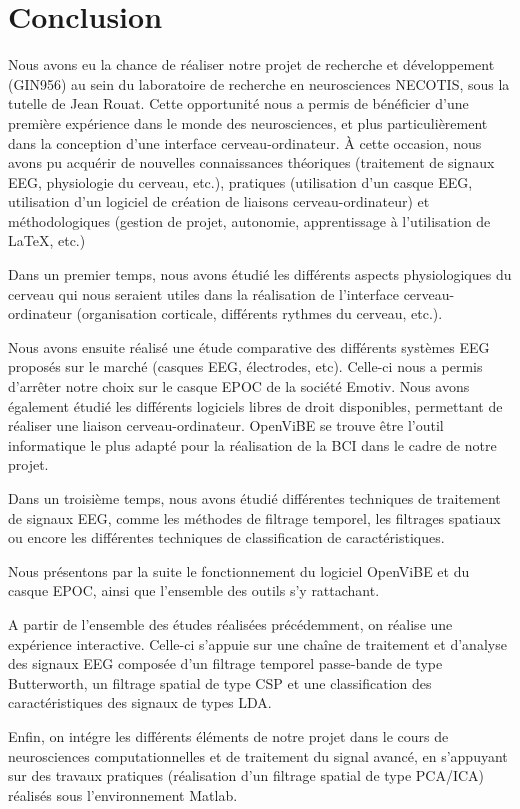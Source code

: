 \chapter* {Conclusion}
\thispagestyle{fancy}



Nous avons eu la chance de réaliser notre projet de recherche et développement (GIN956) au sein du laboratoire de recherche en neurosciences NECOTIS, sous la tutelle de Jean Rouat. Cette opportunité nous a permis de bénéficier d'une première expérience dans le monde des neurosciences, et plus particulièrement dans la conception d'une interface cerveau-ordinateur. À cette occasion, nous avons pu acquérir de nouvelles connaissances théoriques (traitement de signaux EEG, physiologie du cerveau, etc.), pratiques (utilisation d'un casque EEG, utilisation d'un logiciel de création de liaisons cerveau-ordinateur) et méthodologiques (gestion de projet, autonomie, apprentissage à l'utilisation de \LaTeX, etc.)

Dans un premier temps, nous avons étudié les différents aspects physiologiques du cerveau qui nous seraient utiles dans la réalisation de l'interface cerveau-ordinateur (organisation corticale, différents rythmes du cerveau, etc.). 

Nous avons ensuite réalisé une étude comparative des différents systèmes EEG proposés sur le marché (casques EEG, électrodes, etc). Celle-ci nous a permis d'arrêter notre choix sur le casque EPOC de la société Emotiv. Nous avons également étudié les différents logiciels libres de droit disponibles, permettant de réaliser une liaison cerveau-ordinateur. OpenViBE se trouve être l'outil informatique le plus adapté pour la réalisation de la BCI dans le cadre de notre projet. 

Dans un troisième temps, nous avons étudié différentes techniques de traitement de signaux EEG, comme les méthodes de filtrage temporel, les filtrages spatiaux ou encore les différentes techniques de classification de caractéristiques. 

Nous présentons par la suite le fonctionnement du logiciel OpenViBE et du casque EPOC, ainsi que l'ensemble des outils s'y rattachant. 

A partir de l'ensemble des études réalisées précédemment, on réalise une expérience interactive. Celle-ci s'appuie sur une chaîne de traitement et d'analyse des signaux EEG composée d'un filtrage temporel passe-bande de type Butterworth, un filtrage spatial de type CSP et une classification des caractéristiques des signaux de types LDA.

Enfin, on intégre les différents éléments de notre projet dans le cours de neurosciences computationnelles et de traitement du signal avancé, en s'appuyant sur des travaux pratiques (réalisation d'un filtrage spatial de type PCA/ICA) réalisés sous l'environnement Matlab.
